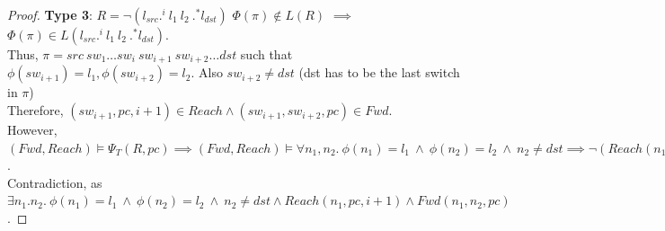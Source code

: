 \begin{proof}
	\newline \newline
	\textbf{Type 3}: $R = \neg (l_{src} .^i \ l_1 \ l_2 \ .^* l_{dst})$ \newline
	$\Phi(\pi) \not\in L(R)$ $\implies$ $\Phi(\pi) \in L (l_{src} .^i \ l_1 \ l_2 \ .^* l_{dst})$. \\
	Thus, $\pi = src\ sw_1 \ldots sw_i \ sw_{i+1} \ sw_{i+2} \ldots dst$ such that \newline $\phi(sw_{i+1}) = l_1, \phi(sw_{i+2}) = l_2$. Also $sw_{i+2} \not=dst$ (dst has to be the last switch in $\pi$)\\
	Therefore,  $(sw_{i+1}, pc, i+1) \in Reach \wedge (sw_{i+1}, sw_{i+2}, pc) \in Fwd$. \\
	However,
	$(Fwd, Reach) \models \Psi_T(R, pc) \implies (Fwd, Reach) \models \forall n_1, n_2.~\phi(n_1) = l_1~\wedge~ \phi(n_2) = l_2 ~\wedge~ n_2 \not=dst  \implies 
	\neg (Reach(n_1, pc, i + 1) \wedge Fwd(n_1, n_2, pc))$. \\
	Contradiction, as $\exists n_1. n_2. ~\phi(n_1) = l_1~\wedge~ \phi(n_2) = l_2 ~\wedge~ n_2 \not=dst \wedge Reach(n_1, pc, i + 1) \wedge Fwd(n_1, n_2, pc)$. 
\end{proof}
\fi

